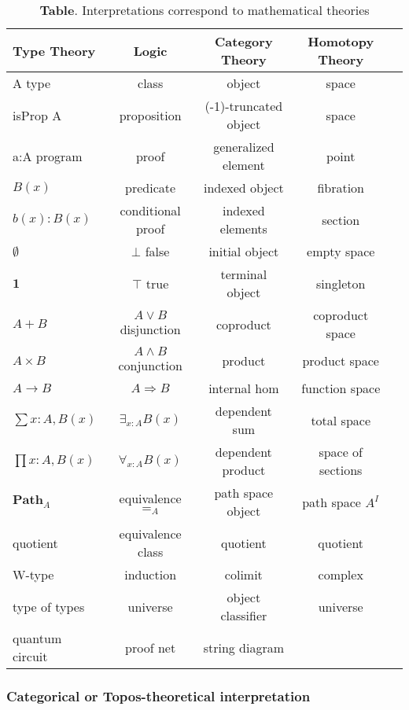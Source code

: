 \documentclass{article}
\theoremstyle{definition}
\begin{document}
\begin{table}[!ht]
  \centering
  \caption*{\textbf{Table}. Interpretations correspond to mathematical theories}
  \begin{adjustbox}{width=\columnwidth,center}
  \begin{tabular}{lcccc}
    \hline
       Type Theory & Logic & Category Theory & Homotopy Theory\\
    \hline
       A type & class & object & space \\
       isProp A & proposition & (-1)-truncated object & space \\
       a:A program & proof & generalized element & point \\
       $B(x)$ & predicate & indexed object & fibration \\
       $b(x) : B(x)$ & conditional proof & indexed elements & section\\
       $\emptyset$ & $\bot$ false & initial object & empty space \\
       $\mathbf{1}$ & $\top$ true & terminal object & singleton \\
       $A + B$ & $A\vee B$ disjunction & coproduct & coproduct space \\
       $A\times B$ & $A\wedge B$ conjunction & product & product space \\
       $A\to B$ & $A\Rightarrow B$ & internal hom & function space \\
       $\sum{x:A},B(x)$ & $\exists_{x:A}B(x)$ & dependent sum & total space \\
       $\prod{x:A},B(x)$ & $\forall_{x:A}B(x)$ & dependent product & space of sections\\
       $\mathbf{Path}_{A}$ & equivalence $=_A$ & path space object & path space $A^I$ \\
       quotient & equivalence class & quotient & quotient \\
       W-type & induction & colimit & complex\\
       type of types & universe & object classifier & universe \\
       quantum circuit & proof net & string diagram & \\
      \hline
  \end{tabular}
  \end{adjustbox}
\end{table}

\subsubsection{Categorical or Topos-theoretical interpretation}
\end{document}
